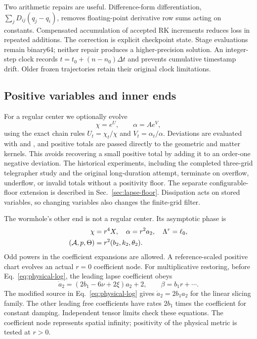 Two arithmetic repairs are useful. Difference-form differentiation, $\sum_jD_{ij}(q_j-q_i)$, removes floating-point derivative row sums acting on constants. Compensated accumulation of accepted RK increments reduces loss in repeated additions. The correction is explicit checkpoint state. Stage evaluations remain binary64; neither repair produces a higher-precision solution. An integer-step clock records $t=t_0+(n-n_0)\Delta t$ and prevents cumulative timestamp drift. Older frozen trajectories retain their original clock limitations.

\subsection{Positive variables and inner ends}
For a regular center we optionally evolve
\begin{equation}
 \chi=e^U,\qquad \alpha=Ae^V,
\end{equation}
using the exact chain rules $U_t=\chi_t/\chi$ and $V_t=\alpha_t/\alpha$. Deviations are evaluated with  and , and positive totals are passed directly to the geometric and matter kernels. This avoids recovering a small positive total by adding it to an order-one negative deviation. The historical experiments, including the completed three-grid telegrapher study and the original long-duration attempt, terminate on overflow, underflow, or invalid totals without a positivity floor. The separate configurable-floor extension is described in Sec.~\ref{sec:lapse-floor}. Dissipation acts on stored variables, so changing variables also changes the finite-grid filter.

The wormhole's other end is not a regular center. Its asymptotic phase is
\begin{align}
 \chi&=r^4X,\quad \alpha=r^2a_2,\quad\Lambda^r=\ell_0,\nonumber\\
 (\mathcal A,p,\Theta)&=r^2(b_2,k_2,\theta_2).
\end{align}
Odd powers in the coefficient expansions are allowed. A reference-scaled positive chart evolves an actual $r=0$ coefficient node. For multiplicative restoring, before Eq.~\eqref{eq:physical-log}, the leading lapse coefficient obeys
\begin{equation}
 \dot a_2=(2b_1-6\nu+2\xi)a_2+2,
 \qquad \beta=b_1r+\cdots.
\end{equation}
The modified source in Eq.~\eqref{eq:physical-log} gives $\dot a_2=2b_1a_2$ for the linear slicing family. The other leading free coefficients have rates $2b_1$ times the coefficient for constant damping. Independent tensor limits check these equations. The coefficient node represents spatial infinity; positivity of the physical metric is tested at $r>0$.

